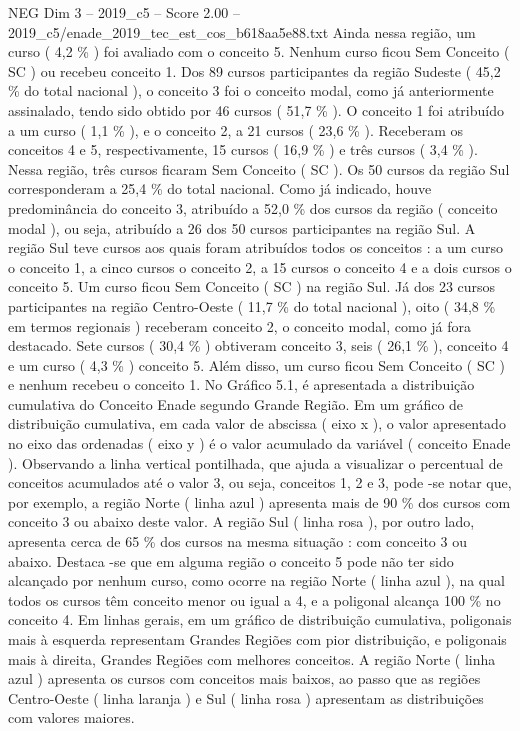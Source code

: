 \begin{textsample}{NEG Dim 3 – 2019\_c5 – Score 2.00 – 2019\_c5/enade\_2019\_tec\_est\_cos\_b618aa5e88.txt}
Ainda nessa região, um curso ( 4,2 \% ) foi avaliado com o conceito 5.
Nenhum curso ficou Sem Conceito ( SC ) ou recebeu conceito 1.
Dos 89 cursos participantes da região Sudeste ( 45,2 \% do total nacional ), o conceito 3 foi o conceito modal, como já anteriormente assinalado, tendo sido obtido por 46 cursos ( 51,7 \% ).
O conceito 1 foi atribuído a um curso ( 1,1 \% ), e o conceito 2, a 21 cursos ( 23,6 \% ).
Receberam os conceitos 4 e 5, respectivamente, 15 cursos ( 16,9 \% ) e três cursos ( 3,4 \% ).
Nessa região, três cursos ficaram Sem Conceito ( SC ).
Os 50 cursos da região Sul corresponderam a 25,4 \% do total nacional.
Como já indicado, houve predominância do conceito 3, atribuído a 52,0 \% dos cursos da região ( conceito modal ), ou seja, atribuído a 26 dos 50 cursos participantes na região Sul.
A região Sul teve cursos aos quais foram atribuídos todos os conceitos : a um curso o conceito 1, a cinco cursos o conceito 2, a 15 cursos o conceito 4 e a dois cursos o conceito 5.
Um curso ficou Sem Conceito ( SC ) na região Sul.
Já dos 23 cursos participantes na região Centro-Oeste ( 11,7 \% do total nacional ), oito ( 34,8 \% em termos regionais ) receberam conceito 2, o conceito modal, como já fora destacado.
Sete cursos ( 30,4 \% ) obtiveram conceito 3, seis ( 26,1 \% ), conceito 4 e um curso ( 4,3 \% ) conceito 5.
Além disso, um curso ficou Sem Conceito ( SC ) e nenhum recebeu o conceito 1.
No Gráfico 5.1, é apresentada a distribuição cumulativa do Conceito Enade segundo Grande Região.
Em um gráfico de distribuição cumulativa, em cada valor de abscissa ( eixo x ), o valor apresentado no eixo das ordenadas ( eixo y ) é o valor acumulado da variável ( conceito Enade ).
Observando a linha vertical pontilhada, que ajuda a visualizar o percentual de conceitos acumulados até o valor 3, ou seja, conceitos 1, 2 e 3, pode -se notar que, por exemplo, a região Norte ( linha azul ) apresenta mais de 90 \% dos cursos com conceito 3 ou abaixo deste valor.
A região Sul ( linha rosa ), por outro lado, apresenta cerca de 65 \% dos cursos na mesma situação : com conceito 3 ou abaixo.
Destaca -se que em alguma região o conceito 5 pode não ter sido alcançado por nenhum curso, como ocorre na região Norte ( linha azul ), na qual todos os cursos têm conceito menor ou igual a 4, e a poligonal alcança 100 \% no conceito 4.
Em linhas gerais, em um gráfico de distribuição cumulativa, poligonais mais à esquerda representam Grandes Regiões com pior distribuição, e poligonais mais à direita, Grandes Regiões com melhores conceitos.
A região Norte ( linha azul ) apresenta os cursos com conceitos mais baixos, ao passo que as regiões Centro-Oeste ( linha laranja ) e Sul ( linha rosa ) apresentam as distribuições com valores maiores.

\end{textsample}
